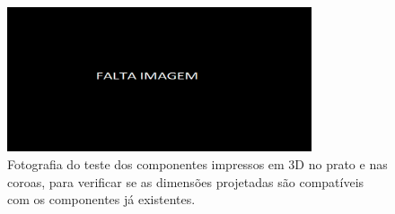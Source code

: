 \begin{figure}[htb]
    \centering
    \includegraphics[width = 0.8\textwidth]{Figures/Cap3/Falta_imagem_larga.png}
    \caption[Teste dos componentes impressos em 3D no prato e nas coroas]%
    {Fotografia do teste dos componentes impressos em 3D no prato e nas coroas, para verificar se as dimensões projetadas são compatíveis com os componentes já existentes.}
    \label{fig:esquema_ensaio_simples}
\end{figure}
